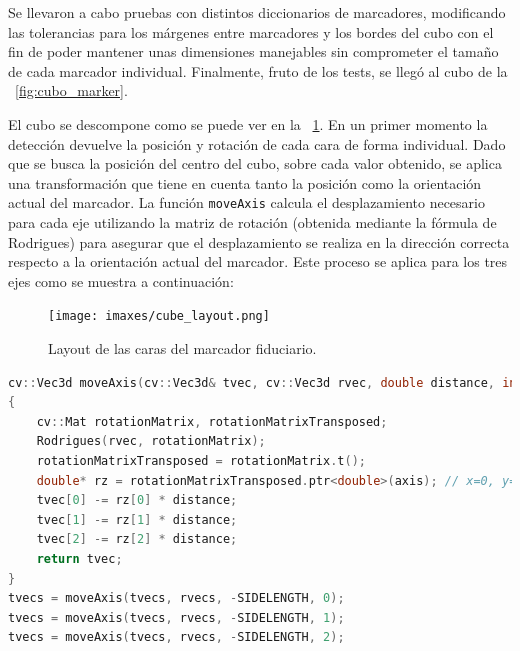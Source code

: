 Se llevaron a cabo pruebas con distintos diccionarios de marcadores, modificando las tolerancias para los márgenes entre marcadores y los bordes del cubo con el fin de poder mantener unas dimensiones manejables sin comprometer el tamaño de cada marcador individual.
Finalmente, fruto de los tests, se llegó al cubo de la \figurename~\ref{fig:cubo_marker}.

El cubo se descompone como se puede ver en la \figurename~\ref{fig:cube_layout}. En un primer momento la detección devuelve la posición y rotación de cada cara de forma individual. Dado que se busca la posición del centro del cubo, sobre cada valor obtenido, se aplica una transformación que tiene en cuenta tanto la posición como la orientación actual del marcador. La función \texttt{moveAxis} calcula el desplazamiento necesario para cada eje utilizando la matriz de rotación (obtenida mediante la fórmula de Rodrigues) para asegurar que el desplazamiento se realiza en la dirección correcta respecto a la orientación actual del marcador. Este proceso se aplica para los tres ejes como se muestra a continuación:

\begin{figure}
	\centering
	\texttt{[image: imaxes/cube\_layout.png]}
	\caption{Layout de las caras del marcador fiduciario.}
	\label{fig:cube_layout}
\end{figure}

\begin{lstlisting}[language=C++]
cv::Vec3d moveAxis(cv::Vec3d& tvec, cv::Vec3d rvec, double distance, int axis)
{
    cv::Mat rotationMatrix, rotationMatrixTransposed;
    Rodrigues(rvec, rotationMatrix);
    rotationMatrixTransposed = rotationMatrix.t();
    double* rz = rotationMatrixTransposed.ptr<double>(axis); // x=0, y=1, z=2
    tvec[0] -= rz[0] * distance;
    tvec[1] -= rz[1] * distance;
    tvec[2] -= rz[2] * distance;
    return tvec;
}
tvecs = moveAxis(tvecs, rvecs, -SIDELENGTH, 0);
tvecs = moveAxis(tvecs, rvecs, -SIDELENGTH, 1);
tvecs = moveAxis(tvecs, rvecs, -SIDELENGTH, 2);

\end{lstlisting}


